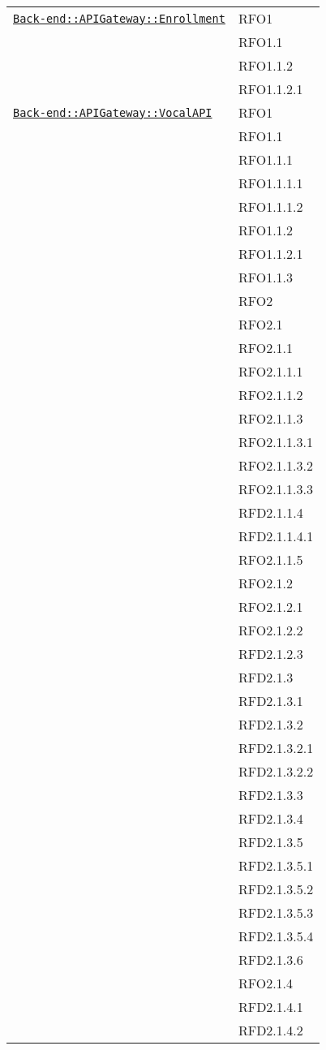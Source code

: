 \begin{longtable}{|>{\centering}m{10cm}|m{3cm}<{\centering}|}
\hyperref[Back-end::APIGateway::Enrollment]{\texttt{Back-end::APIGateway::Enrollment}} & RFO1\\
& RFO1.1\\
& RFO1.1.2\\
& RFO1.1.2.1\\ \hline

\hyperref[Back-end::APIGateway::VocalAPI]{\texttt{Back-end::APIGateway::VocalAPI}} & RFO1\\
& RFO1.1\\
& RFO1.1.1\\
& RFO1.1.1.1\\
& RFO1.1.1.2\\
& RFO1.1.2\\
& RFO1.1.2.1\\
& RFO1.1.3\\
& RFO2\\
& RFO2.1\\
& RFO2.1.1\\
& RFO2.1.1.1\\
& RFO2.1.1.2\\
& RFO2.1.1.3\\
& RFO2.1.1.3.1\\
& RFO2.1.1.3.2\\
& RFO2.1.1.3.3\\
& RFD2.1.1.4\\
& RFD2.1.1.4.1\\
& RFO2.1.1.5\\
& RFO2.1.2\\
& RFO2.1.2.1\\
& RFO2.1.2.2\\
& RFD2.1.2.3\\
& RFD2.1.3\\
& RFD2.1.3.1\\
& RFD2.1.3.2\\
& RFD2.1.3.2.1\\
& RFD2.1.3.2.2\\
& RFD2.1.3.3\\
& RFD2.1.3.4\\
& RFD2.1.3.5\\
& RFD2.1.3.5.1\\
& RFD2.1.3.5.2\\
& RFD2.1.3.5.3\\
& RFD2.1.3.5.4\\
& RFD2.1.3.6\\
& RFO2.1.4\\
& RFD2.1.4.1\\
& RFD2.1.4.2\\

\end{longtable}
